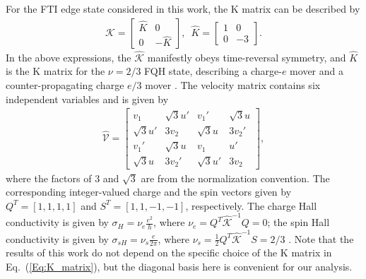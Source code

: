 \documentclass[aps,prx,amsmath,superscriptaddress,twocolumn,bibnotes,longbibliography,floatfix]{revtex4-2}
\begin{document}
	For the FTI edge state considered in this work, the K matrix can be described by \cite{KaneCL1994,NeupertT2011a}
	\begin{align}\label{Eq:K_matrix}
		\hat{\mathcal{K}}=\begin{bmatrix}
			\hat{K} & 0\\
			0 & -\hat{K}
		\end{bmatrix},\,\,\,\hat{K}=\begin{bmatrix}
		1 & 0\\
		0 & -3
		\end{bmatrix}.
	\end{align}
	In the above expressions, the $\hat{\mathcal{K}}$ manifestly obeys time-reversal symmetry, and $\hat{K}$ is the K matrix for the $\nu=2/3$ FQH state, describing a charge-$e$ mover and a counter-propagating charge $e/3$ mover \cite{KaneCL1994}. The velocity matrix contains six independent variables and is given by
	\begin{align}
		\label{Eq:V_matrix}
			\hat{\mathcal{V}}=\begin{bmatrix}
				v_1 & \sqrt{3}u' & v_1' & \sqrt{3}u\\
				\sqrt{3}u' & 3v_2 & \sqrt{3}u & 3v_2'\\
				v_1' & \sqrt{3}u & v_1 & u'\\
				\sqrt{3}u & 3v_2' & \sqrt{3}u' & 3v_2
			\end{bmatrix},
	\end{align}
	where the factors of 3 and $\sqrt{3}$ are from the normalization convention.
	The corresponding integer-valued charge and the spin vectors given by $Q^T=[1,1,1,1]$ and $S^T=[1,1,-1,-1]$, respectively.
	The charge Hall conductivity is given by $\sigma_H=\nu_e\frac{e^2}{h}$, where $\nu_e=Q^T\hat{\mathcal{K}}^{-1}Q=0$; the spin Hall conductivity is given by $\sigma_{sH}=\nu_s\frac{e}{2\pi}$, where $\nu_s=\frac{1}{2}Q^T\hat{\mathcal{K}}^{-1}S=2/3$ \cite{NeupertT2011a}.  Note that the results of this work do not depend on the specific choice of the K matrix in Eq.~(\ref{Eq:K_matrix}), but the diagonal basis here is convenient for our analysis.
\end{document}
